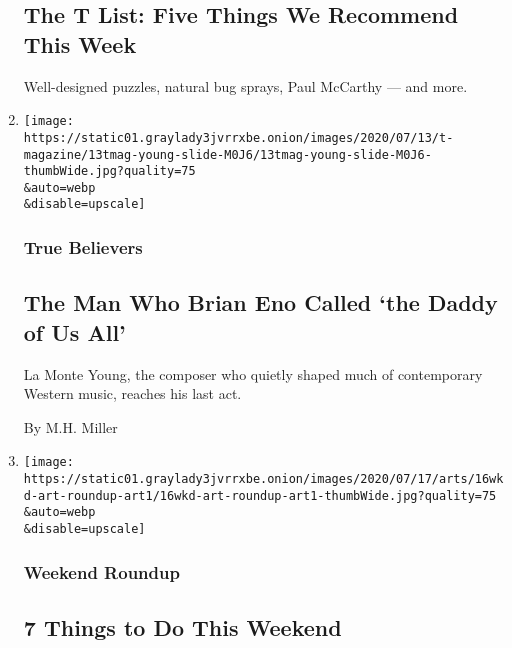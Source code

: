 \begin{enumerate}
  \hypertarget{the-t-list-five-things-we-recommend-this-week-1}{%
  \subsection{The T List: Five Things We Recommend This
  Week}\label{the-t-list-five-things-we-recommend-this-week-1}}

  Well-designed puzzles, natural bug sprays, Paul McCarthy --- and more.
\item
  \href{/2020/07/22/t-magazine/la-monte-young.html}{}

  \texttt{[image: https://static01.graylady3jvrrxbe.onion/images/2020/07/13/t-magazine/13tmag-young-slide-M0J6/13tmag-young-slide-M0J6-thumbWide.jpg?quality=75\\\&auto=webp\\\&disable=upscale]}

  \hypertarget{true-believers}{%
  \subsubsection{True Believers}\label{true-believers}}

  \hypertarget{the-man-who-brian-eno-called-the-daddy-of-us-all}{%
  \subsection{The Man Who Brian Eno Called `the Daddy of Us
  All'}\label{the-man-who-brian-eno-called-the-daddy-of-us-all}}

  La Monte Young, the composer who quietly shaped much of contemporary
  Western music, reaches his last act.

  By M.H. Miller
\item
  \href{/2020/07/16/arts/things-to-do-weekend-coronavirus.html}{}

  \texttt{[image: https://static01.graylady3jvrrxbe.onion/images/2020/07/17/arts/16wkd-art-roundup-art1/16wkd-art-roundup-art1-thumbWide.jpg?quality=75\\\&auto=webp\\\&disable=upscale]}

  \hypertarget{weekend-roundup}{%
  \subsubsection{Weekend Roundup}\label{weekend-roundup}}

  \hypertarget{7-things-to-do-this-weekend}{%
  \subsection{7 Things to Do This
  Weekend}\label{7-things-to-do-this-weekend}}


\end{enumerate}

